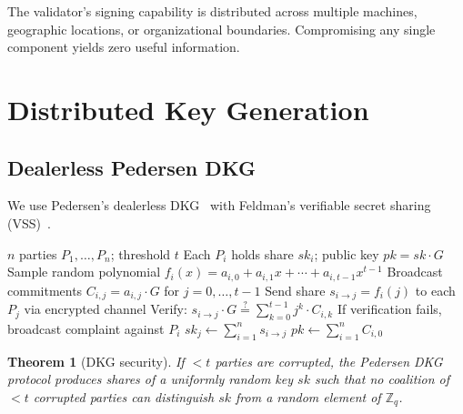 \documentclass[11pt,a4paper]{article}
\newtheorem{theorem}{Theorem}[section]
\begin{document}
The validator's signing capability is distributed across multiple machines,
geographic locations, or organizational boundaries. Compromising any single
component yields zero useful information.

\section{Distributed Key Generation}
\label{sec:dkg}

\subsection{Dealerless Pedersen DKG}

We use Pedersen's dealerless DKG~\cite{pedersen1991threshold} with Feldman's
verifiable secret sharing (VSS)~\cite{feldman1987practical}.

\begin{algorithm}[ht]
\caption{Dealerless DKG for $(t, n)$ threshold.}
\label{alg:dkg}
\begin{algorithmic}[1]
\Require $n$ parties $P_1, \ldots, P_n$; threshold $t$
\Ensure Each $P_i$ holds share $sk_i$; public key $pk = sk \cdot G$
  \State Sample random polynomial $f_i(x) = a_{i,0} + a_{i,1}x + \cdots + a_{i,t-1}x^{t-1}$
  \State Broadcast commitments $C_{i,j} = a_{i,j} \cdot G$ for $j = 0, \ldots, t-1$
  \State Send share $s_{i \to j} = f_i(j)$ to each $P_j$ via encrypted channel
\EndFor
{}
    \State Verify: $s_{i \to j} \cdot G \stackrel{?}{=} \sum_{k=0}^{t-1} j^k \cdot C_{i,k}$
    \State If verification fails, broadcast complaint against $P_i$
  \EndFor
  \State $sk_j \leftarrow \sum_{i=1}^{n} s_{i \to j}$ 
\EndFor
\State $pk \leftarrow \sum_{i=1}^{n} C_{i,0}$ 
\end{algorithmic}
\end{algorithm}

\begin{theorem}[DKG security]
\label{thm:dkg}
If $< t$ parties are corrupted, the Pedersen DKG protocol produces shares of a
uniformly random key $sk$ such that no coalition of $< t$ corrupted parties can
distinguish $sk$ from a random element of $\mathbb{Z}_q$.
\end{theorem}
\end{document}
